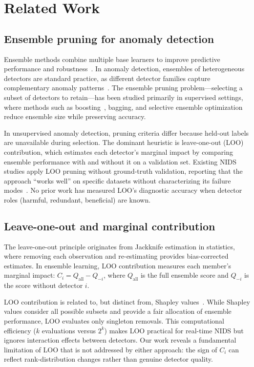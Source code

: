 \section{Related Work}
\label{sec:related}

\subsection{Ensemble pruning for anomaly detection}

Ensemble methods combine multiple base learners to improve predictive performance and robustness~\cite{zhou2002ensembles}. In anomaly detection, ensembles of heterogeneous detectors are standard practice, as different detector families capture complementary anomaly patterns~\cite{aggarwal2015outlier}. The ensemble pruning problem---selecting a subset of detectors to retain---has been studied primarily in supervised settings, where methods such as boosting~\cite{breiman1966bagging}, bagging, and selective ensemble optimization reduce ensemble size while preserving accuracy.

In unsupervised anomaly detection, pruning criteria differ because held-out labels are unavailable during selection. The dominant heuristic is leave-one-out (LOO) contribution, which estimates each detector's marginal impact by comparing ensemble performance with and without it on a validation set. Existing NIDS studies apply LOO pruning without ground-truth validation, reporting that the approach ``works well'' on specific datasets without characterizing its failure modes~\cite{mollmark2021nids}. No prior work has measured LOO's diagnostic accuracy when detector roles (harmful, redundant, beneficial) are known.

\subsection{Leave-one-out and marginal contribution}

The leave-one-out principle originates from Jackknife estimation in statistics, where removing each observation and re-estimating provides bias-corrected estimates. In ensemble learning, LOO contribution measures each member's marginal impact: $C_i = Q_{\text{all}} - Q_{-i}$, where $Q_{\text{all}}$ is the full ensemble score and $Q_{-i}$ is the score without detector $i$.

LOO contribution is related to, but distinct from, Shapley values~\cite{davis2006relationship}. While Shapley values consider all possible subsets and provide a fair allocation of ensemble performance, LOO evaluates only singleton removals. This computational efficiency ($k$ evaluations versus $2^k$) makes LOO practical for real-time NIDS but ignores interaction effects between detectors. Our work reveals a fundamental limitation of LOO that is not addressed by either approach: the sign of $C_i$ can reflect rank-distribution changes rather than genuine detector quality.

